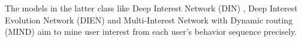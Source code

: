 The models in the latter class like Deep Interest Network (DIN) \cite{zhou2018deep}, Deep Interest Evolution Network (DIEN) \cite{zhou2019deep} and Multi-Interest Network with Dynamic routing (MIND) \cite{li2019multi} aim to mine user interest from each user's behavior sequence precisely.

